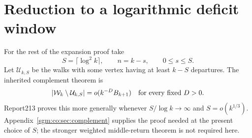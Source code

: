 \documentclass[11pt,letterpaper]{article}
\theoremstyle{remark}\newtheorem{remark}[theorem]{Remark}
\newcommand{\Wc}{\mathcal W}\newcommand{\Uc}{\mathcal U}\newcommand{\Part}{\operatorname{Part}}
\theoremstyle{definition}\newtheorem{definition}[theorem]{Definition}
\begin{document}
\section{Reduction to a logarithmic deficit window}\label{sgm:co:sec:reduction}
For the rest of the expansion proof take
\[
 S=\lceil\log^2k\rceil,\qquad n=k-s,\qquad 0\le s\le S.
\]
Let $\Uc_{k,S}$ be the walks with some vertex having at least $k-S$ departures. The inherited complement theorem is
\begin{equation}\label{sgm:co:eq:complementinput}
 |\Wc_k\setminus\Uc_{k,S}|=o(k^{-D}B_{k+1})
 \quad\hbox{for every fixed }D>0.
\end{equation}
Report213 proves this more generally whenever $S/\log k\to\infty$ and $S=o(k^{1/3})$. Appendix~\ref{sgm:co:sec:complement} supplies the proof needed at the present choice of $S$; the stronger weighted middle-return theorem is not required here.
\end{document}
